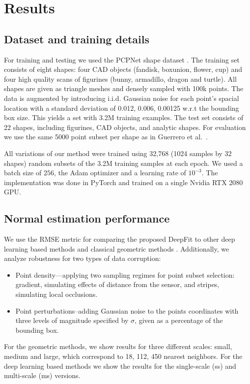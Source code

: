 \section{Results}
\label{Sec:results}

\subsection{Dataset and training details} 
For training and testing we used the PCPNet shape dataset \cite{guerrero2018pcpnet}. The training set consists of eight shapes: four CAD objects (fandisk, boxunion, flower, cup) and four high quality scans of figurines (bunny, armadillo, dragon and turtle). All shapes are given as triangle meshes and densely sampled with 100k points. The data is augmented by introducing i.i.d. Gaussian noise for each point's spacial location with a standard deviation of  0.012, 0.006, 0.00125 w.r.t the bounding box size. This yields a set with 3.2M training examples. The test set consists of 22 shapes, including figurines, CAD objects, and analytic shapes. For evaluation we use the same 5000 point subset per shape as in Guerrero et al.~\cite{guerrero2018pcpnet}.

All variations of our method were trained using 32,768 (1024 samples by 32 shapes) random subsets of the 3.2M training samples at each epoch. We used a batch size of $256$, the Adam optimizer and a learning rate of $10^{-3}$. The implementation was done in PyTorch and trained on a single Nvidia RTX 2080 GPU.

\subsection{Normal estimation performance}
\label{SubSec:results:baseline_n_est}

 We use the RMSE metric for comparing the proposed DeepFit to other deep learning based methods \cite{guerrero2018pcpnet,ben2019nesti,lenssen2019differentiable} and classical geometric methods \cite{hoppe1992surface,cazals2005estimating}. 
 Additionally, we analyze robustness for two types of data corruption: 
\begin{itemize}
    \item  Point density---applying two sampling regimes for point subset selection: gradient, simulating effects of distance from the sensor, and stripes, simulating local occlusions.    
    \item Point perturbations--adding Gaussian noise to the points coordinates with three levels of magnitude specified by $\sigma$, given as a percentage of the bounding box.
\end{itemize}
For the geometric methods, we show results for three different scales: small, medium and large, which correspond to 18, 112, 450 nearest neighbors. For the deep learning based methods we show the results for the single-scale (ss) and multi-scale (ms) versions.

